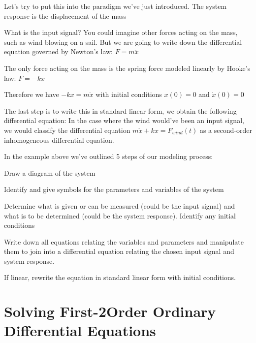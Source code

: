 \documentclass[11pt, openright]{book}
\begin{document}
\begin{dent}{}
\begin{figure}[!htb]
\begin{floatrow}
        \end{floatrow}
    \end{figure}

    \newpage

    Let's try to put this into the  paradigm we've just introduced. The system response is the displacement of the mass

    What is the input signal? You could imagine other forces acting on the mass, such as wind blowing on a sail. But we are going to write down the differential equation governed by Newton's law: $F=m\ddot{x}$

    The only force acting on the mass is the spring force modeled linearly by Hooke's law: $F=-kx$

    Therefore we have $-kx=m\ddot{x}$ with initial conditions $x(0)=0$ and $\dot{x}(0)=0$

    The last step is to write this in standard linear form, we obtain the following differential equation:
    In the case where the wind would've been an input signal, we would classify the differential equation $m\ddot{x}+kx=F_{wind}(t)$ as a second-order inhomogeneous differential equation.
\end{dent}

In the example above we've outlined 5 steps of our modeling process:
\begin{items}{-15pt}{-15pt}
    \item Draw a diagram of the system
    \item Identify and give symbols for the parameters and variables of the system
    \item Determine what is given or can be measured (could be the input signal) and what is to be determined (could be the system response). Identify any initial conditions
    \item Write down all equations relating the variables and parameters and manipulate them to join into a differential equation relating the chosen input signal and system response.
    \item If linear, rewrite the equation in standard linear form with initial conditions.
\end{items}

\newpage

\section{Solving First-2Order Ordinary Differential Equations}
\end{document}
